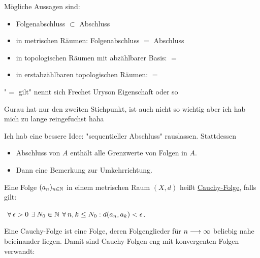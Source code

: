 \begin{proposition}
    \label{prop-equivalence-of-closures}
    Mögliche Aussagen sind:
    \begin{itemize}
        \item Folgenabschluss $\subset$ Abschluss
        \item in metrischen Räumen: Folgenabschluss $=$ Abschluss
        \item in topologischen Räumen mit abzählbarer Basis: $=$
        \item in erstabzählbaren topologischen Räumen: $=$
    \end{itemize}
    "$=$ gilt" nennt sich Frechet Uryson Eigenschaft oder so
    
    Gurau hat nur den zweiten Stichpunkt, ist auch nicht so wichtig aber ich hab mich zu lange reingefuchst haha

    Ich hab eine bessere Idee: "sequentieller Abschluss" rauslassen. Stattdessen
    \begin{itemize}
        \item Abschluss von $A$ enthält alle Grenzwerte von Folgen in $A$.
        \item Dann eine Bemerkung zur Umkehrrichtung.
    \end{itemize}
\end{proposition}

\begin{definition}
    \label{def-cauchy-sequence}
    Eine Folge $(a_n)_{n \in \mathbb{N}}$ in einem metrischen Raum $(X, d)$ heißt \underline{Cauchy-Folge}, falls gilt:

    $\forall \epsilon > 0 \exists N_0 \in \N \forall n, k \leq N_0: d(a_n, a_k) < \epsilon$.
\end{definition}

Eine Cauchy-Folge ist eine Folge, deren Folgenglieder für $n \longrightarrow \infty$ beliebig nahe beieinander liegen. Damit sind Cauchy-Folgen eng mit konvergenten Folgen verwandt:

